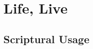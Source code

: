 \section{Life, Live}
	\label{LIFE}
	





\subsection{Scriptural Usage} %
	\label{LIFE-SCRIPTURES}

	
	
